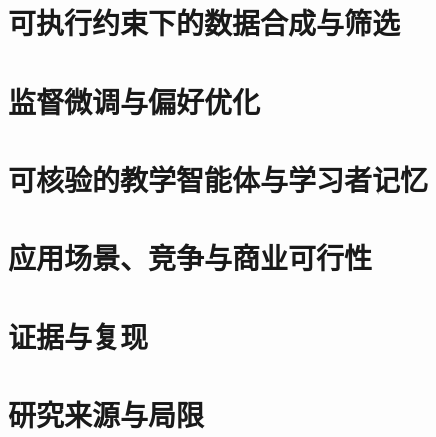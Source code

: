 \documentclass[11pt,a4paper,oneside,openany]{report}
\newcommand{\chapterprefix}{第\thechapter 章}
\begin{document}

\clearpage{\small\linespread{0.98}\selectfont\setlength{\parskip}{0pt}\tableofcontents}
\clearpage{}
\chapter{可执行约束下的数据合成与筛选}\label{ch:data}\FloatBarrier
\chapter{监督微调与偏好优化}\label{ch:training}\FloatBarrier
\chapter{可核验的教学智能体与学习者记忆}\label{ch:agents}\FloatBarrier
\chapter{应用场景、竞争与商业可行性}\label{ch:business}\FloatBarrier

\appendix\renewcommand{\chapterprefix}{附录\thechapter}
\chapter{证据与复现}\label{app:repro}\FloatBarrier
\chapter{研究来源与局限}\label{app:prompts}
\end{document}
